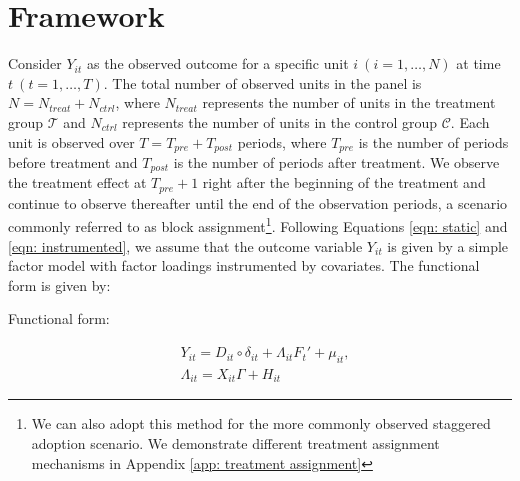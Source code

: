 \documentclass[12pt]{article}
\begin{document}
\section{Framework} 
\label{sec: framework}

Consider $Y_{it}$ as the observed outcome for a specific unit $i \ (i = 1, \dots, N)$ at time $t \ (t = 1, \dots, T)$. The total number of observed units in the panel is $N = N_{treat} + N_{ctrl}$, where $N_{treat}$ represents the number of units in the treatment group $\mathcal{T}$ and $N_{ctrl}$ represents the number of units in the control group $\mathcal{C}$. Each unit is observed over $T = T_{pre} + T_{post}$ periods, where $T_{pre}$ is the number of periods before treatment and $T_{post}$ is the number of periods after treatment. We observe the treatment effect at $T_{pre} + 1$ right after the beginning of the treatment and continue to observe thereafter until the end of the observation periods, a scenario commonly referred to as block assignment\footnote{We can also adopt this method for the more commonly observed staggered adoption scenario. We demonstrate different treatment assignment mechanisms in Appendix \ref{app: treatment assignment}}. Following Equations \ref{eqn: static} and \ref{eqn: instrumented}, we assume that the outcome variable $Y_{it}$ is given by a simple factor model with factor loadings instrumented by covariates. The functional form is given by:

\begin{assumption}
Functional form:
\label{ass: function}
\end{assumption}

\begin{equation}
\begin{aligned}
& Y_{it} = D_{it} \circ \delta_{it} + \Lambda_{it}F_{t}' + \mu_{it}, \\
& \Lambda_{it} = X_{it}\Gamma + H_{it}
\end{aligned}
\label{eqn: functional form}
\end{equation}
\end{document}
